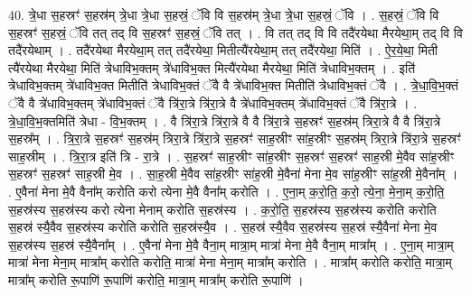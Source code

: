 \documentclass[17pt]{extarticle}
\begin{document}
40. त्रे॒धा स॒हस्रꣳ॑ स॒हस्र॑म् त्रे॒धा त्रे॒धा स॒हस्रं॒ ॅवि वि स॒हस्र॑म् त्रे॒धा त्रे॒धा स॒हस्रं॒ ॅवि । . स॒हस्रं॒ ॅवि वि स॒हस्रꣳ॑ स॒हस्रं॒ ॅवि तत् तद् वि स॒हस्रꣳ॑ स॒हस्रं॒ ॅवि तत् । . वि तत् तद् वि वि तदै॑रयेथा मैरयेथा॒म् तद् वि वि तदै॑रयेथाम् । . तदै॑रयेथा मैरयेथा॒म् तत् तदै॑रयेथा॒ मितीत्यै॑रयेथा॒म् तत् तदै॑रयेथा॒ मिति॑ । . ऐ॒र॒ये॒था॒ मिती त्यै॑रयेथा मैरयेथा॒ मिति॑ त्रेधाविभ॒क्तम् त्रे॑धाविभ॒क्त मित्यै॑रयेथा मैरयेथा॒ मिति॑ त्रेधाविभ॒क्तम् । . इति॑ त्रेधाविभ॒क्तम् त्रे॑धाविभ॒क्त मितीति॑ त्रेधाविभ॒क्तं ॅवै वै त्रे॑धाविभ॒क्त मितीति॑ त्रेधाविभ॒क्तं ॅवै । . त्रे॒धा॒वि॒भ॒क्तं ॅवै वै त्रे॑धाविभ॒क्तम् त्रे॑धाविभ॒क्तं ॅवै त्रि॑रा॒त्रे त्रि॑रा॒त्रे वै त्रे॑धाविभ॒क्तम् त्रे॑धाविभ॒क्तं ॅवै त्रि॑रा॒त्रे । . त्रे॒धा॒वि॒भ॒क्तमिति॑ त्रेधा - वि॒भ॒क्तम् । . वै त्रि॑रा॒त्रे त्रि॑रा॒त्रे वै वै त्रि॑रा॒त्रे स॒हस्रꣳ॑ स॒हस्र॑म् त्रिरा॒त्रे वै वै त्रि॑रा॒त्रे स॒हस्र᳚म् । . त्रि॒रा॒त्रे स॒हस्रꣳ॑ स॒हस्र॑म् त्रिरा॒त्रे त्रि॑रा॒त्रे स॒हस्रꣳ॑ साह॒स्रीꣳ सा॑ह॒स्रीꣳ स॒हस्र॑म् त्रिरा॒त्रे त्रि॑रा॒त्रे स॒हस्रꣳ॑ साह॒स्रीम् । . त्रि॒रा॒त्र इति॑ त्रि - रा॒त्रे । . स॒हस्रꣳ॑ साह॒स्रीꣳ सा॑ह॒स्रीꣳ स॒हस्रꣳ॑ स॒हस्रꣳ॑ साह॒स्री मे॒वैव सा॑ह॒स्रीꣳ स॒हस्रꣳ॑ स॒हस्रꣳ॑ साह॒स्री मे॒व । . सा॒ह॒स्री मे॒वैव सा॑ह॒स्रीꣳ सा॑ह॒स्री मे॒वैना॑ मेना मे॒व सा॑ह॒स्रीꣳ सा॑ह॒स्री मे॒वैना᳚म् । . ए॒वैना॑ मेना मे॒वै वैना᳚म् करोति करो त्येना मे॒वै वैना᳚म् करोति । . ए॒ना॒म् क॒रो॒ति॒ क॒रो॒ त्ये॒ना॒ मे॒ना॒म् क॒रो॒ति॒ स॒हस्र॑स्य स॒हस्र॑स्य करो त्येना मेनाम् करोति स॒हस्र॑स्य । . क॒रो॒ति॒ स॒हस्र॑स्य स॒हस्र॑स्य करोति करोति स॒हस्र॑ स्यै॒वैव स॒हस्र॑स्य करोति करोति स॒हस्र॑स्यै॒व । . स॒हस्र॑ स्यै॒वैव स॒हस्र॑स्य स॒हस्र॑ स्यै॒वैना॑ मेना मे॒व स॒हस्र॑स्य स॒हस्र॑ स्यै॒वैना᳚म् । . ए॒वैना॑ मेना मे॒वै वैना॒म् मात्रा॒म् मात्रा॑ मेना मे॒वै वैना॒म् मात्रा᳚म् । . ए॒ना॒म् मात्रा॒म् मात्रा॑ मेना मेना॒म् मात्रा᳚म् करोति करोति॒ मात्रा॑ मेना मेना॒म् मात्रा᳚म् करोति । . मात्रा᳚म् करोति करोति॒ मात्रा॒म् मात्रा᳚म् करोति रू॒पाणि॑ रू॒पाणि॑ करोति॒ मात्रा॒म् मात्रा᳚म् करोति रू॒पाणि॑ । \newline
\pagebreak
{}
\end{document}
